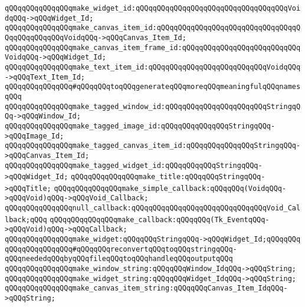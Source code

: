 \verb|qQQqqQQqqQQqqQQqmake_widget_id:qQQqqQQqqQQqqQQqqQQqqQQqqQQqqQQqqQQqVoidqQQq->qQQqWidget_Id;|\newline
\verb|qQQqqQQqqQQqqQQqmake_canvas_item_id:qQQqqQQqqQQqqQQqqQQqqQQqqQQqqQQqqQQqqQQqqQQqqQQqVoidqQQq->qQQqCanvas_Item_Id;|\newline
\verb|qQQqqQQqqQQqqQQqmake_canvas_item_frame_id:qQQqqQQqqQQqqQQqqQQqqQQqqQQqVoidqQQq->qQQqWidget_Id;|\newline
\verb|qQQqqQQqqQQqqQQqmake_text_item_id:qQQqqQQqqQQqqQQqqQQqqQQqqQQqVoidqQQq->qQQqText_Item_Id;|\newline
\newline
\verb|qQQqqQQqqQQqqQQq#qQQqqQQqtoqQQqgenerateqQQqmoreqQQqmeaningfulqQQqnamesqQQq|\newline
\verb|qQQqqQQqqQQqqQQqmake_tagged_window_id:qQQqqQQqqQQqqQQqqQQqqQQqStringqQQq->qQQqWindow_Id;|\newline
\verb|qQQqqQQqqQQqqQQqmake_tagged_image_id:qQQqqQQqqQQqqQQqStringqQQq->qQQqImage_Id;|\newline
\verb|qQQqqQQqqQQqqQQqmake_tagged_canvas_item_id:qQQqqQQqqQQqqQQqStringqQQq->qQQqCanvas_Item_Id;|\newline
\verb|qQQqqQQqqQQqqQQqmake_tagged_widget_id:qQQqqQQqqQQqStringqQQq->qQQqWidget_Id;|\newline
\newline
\verb|qQQqqQQqqQQqqQQqmake_title:qQQqqQQqStringqQQq->qQQqTitle;|\newline
\verb|qQQqqQQqqQQqqQQqmake_simple_callback:qQQqqQQq(VoidqQQq->qQQqVoid)qQQq->qQQqVoid_Callback;|\newline
\verb|qQQqqQQqqQQqqQQqnull_callback:qQQqqQQqqQQqqQQqqQQqqQQqqQQqqQQqVoid_Callback;qQQq|\newline
\verb|qQQqqQQqqQQqqQQqmake_callback:qQQqqQQq(Tk_EventqQQq->qQQqVoid)qQQq->qQQqCallback;|\newline
\verb|qQQqqQQqqQQqqQQqmake_widget:qQQqqQQqStringqQQq->qQQqWidget_Id;qQQqqQQq|\newline
\newline
\verb|qQQqqQQqqQQqqQQq#qQQqqQQqreconvertqQQqtoqQQqstringqQQq-qQQqneededqQQqbyqQQqfileqQQqtoqQQqhandleqQQqoutputqQQq|\newline
\verb|qQQqqQQqqQQqqQQqmake_window_string:qQQqqQQqWindow_IdqQQq->qQQqString;|\newline
\verb|qQQqqQQqqQQqqQQqmake_widget_string:qQQqqQQqWidget_IdqQQq->qQQqString;|\newline
\verb|qQQqqQQqqQQqqQQqmake_canvas_item_string:qQQqqQQqCanvas_Item_IdqQQq->qQQqString;|\newline
